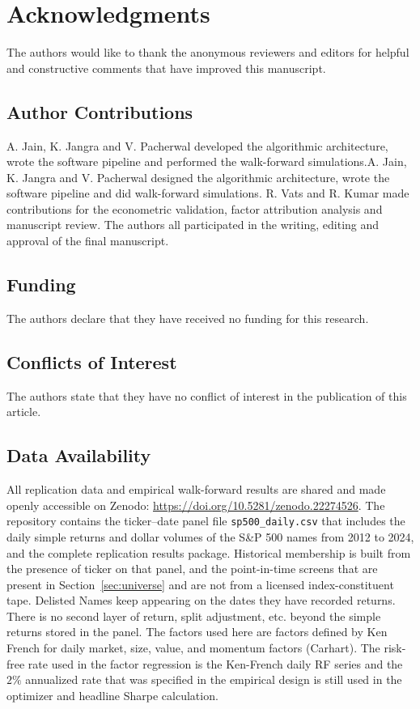 \documentclass[11pt,a4paper]{article}
\begin{document}
\section*{Acknowledgments}
The authors would like to thank the anonymous reviewers and editors for helpful and constructive comments that have improved this manuscript.

\subsection*{Author Contributions}
A. Jain, K. Jangra and V. Pacherwal developed the algorithmic architecture, wrote the software pipeline and performed the walk-forward simulations.A. Jain, K. Jangra and V. Pacherwal designed the algorithmic architecture, wrote the software pipeline and did walk-forward simulations. R. Vats and R. Kumar made contributions for the econometric validation, factor attribution analysis and manuscript review. The authors all participated in the writing, editing and approval of the final manuscript.

\subsection*{Funding}
The authors declare that they have received no funding for this research.

\subsection*{Conflicts of Interest}
The authors state that they have no conflict of interest in the publication of this article.

\subsection*{Data Availability}
All replication data and empirical walk-forward results are shared and made openly accessible on Zenodo: \url{https://doi.org/10.5281/zenodo.22274526}. The repository contains the ticker--date panel file \texttt{sp500\_daily.csv} that includes the daily simple returns and dollar volumes of the S\&P 500 names from 2012 to 2024, and the complete replication results package. Historical membership is built from the presence of ticker on that panel, and the point-in-time screens that are present in Section~\ref{sec:universe} and are not from a licensed index-constituent tape. Delisted Names keep appearing on the dates they have recorded returns. There is no second layer of return, split adjustment, etc. beyond the simple returns stored in the panel. The factors used here are factors defined by Ken French for daily market, size, value, and momentum factors (Carhart). The risk-free rate used in the factor regression is the Ken-French daily RF series and the $2 \%$ annualized rate that was specified in the empirical design is still used in the optimizer and headline Sharpe calculation.
\end{document}
